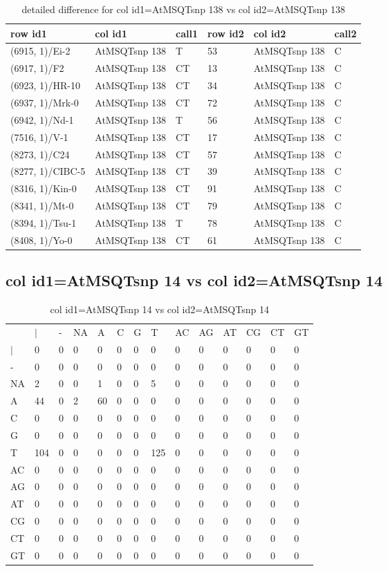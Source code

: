 \begin{center}
\begin{longtable}{|l|l|l|l|l|l|}
\caption{detailed difference for col id1=AtMSQTsnp 138 vs col id2=AtMSQTsnp 138} \label{table_dm719}\\
\hline
row id1&col id1&call1&row id2&col id2&call2\\
\hline
(6915, 1)/Ei-2&AtMSQTsnp 138&T&53&AtMSQTsnp 138&C\\
(6917, 1)/F2&AtMSQTsnp 138&CT&13&AtMSQTsnp 138&C\\
(6923, 1)/HR-10&AtMSQTsnp 138&CT&34&AtMSQTsnp 138&C\\
(6937, 1)/Mrk-0&AtMSQTsnp 138&CT&72&AtMSQTsnp 138&C\\
(6942, 1)/Nd-1&AtMSQTsnp 138&T&56&AtMSQTsnp 138&C\\
(7516, 1)/V-1&AtMSQTsnp 138&CT&17&AtMSQTsnp 138&C\\
(8273, 1)/C24&AtMSQTsnp 138&CT&57&AtMSQTsnp 138&C\\
(8277, 1)/CIBC-5&AtMSQTsnp 138&CT&39&AtMSQTsnp 138&C\\
(8316, 1)/Kin-0&AtMSQTsnp 138&CT&91&AtMSQTsnp 138&C\\
(8341, 1)/Mt-0&AtMSQTsnp 138&CT&79&AtMSQTsnp 138&C\\
(8394, 1)/Tsu-1&AtMSQTsnp 138&T&78&AtMSQTsnp 138&C\\
(8408, 1)/Yo-0&AtMSQTsnp 138&CT&61&AtMSQTsnp 138&C\\
\hline
\end{longtable}
\end{center}

\subsection{col id1=AtMSQTsnp 14 vs col id2=AtMSQTsnp 14}
\begin{center}
\begin{longtable}{|l|l|l|l|l|l|l|l|l|l|l|l|l|l|}
\caption{col id1=AtMSQTsnp 14 vs col id2=AtMSQTsnp 14} \label{table_dm720}\\
\hline
\\
\hline
&$|$&-&NA&A&C&G&T&AC&AG&AT&CG&CT&GT\\
$|$&0&0&0&0&0&0&0&0&0&0&0&0&0\\
-&0&0&0&0&0&0&0&0&0&0&0&0&0\\
NA&2&0&0&1&0&0&5&0&0&0&0&0&0\\
A&44&0&2&60&0&0&0&0&0&0&0&0&0\\
C&0&0&0&0&0&0&0&0&0&0&0&0&0\\
G&0&0&0&0&0&0&0&0&0&0&0&0&0\\
T&104&0&0&0&0&0&125&0&0&0&0&0&0\\
AC&0&0&0&0&0&0&0&0&0&0&0&0&0\\
AG&0&0&0&0&0&0&0&0&0&0&0&0&0\\
AT&0&0&0&0&0&0&0&0&0&0&0&0&0\\
CG&0&0&0&0&0&0&0&0&0&0&0&0&0\\
CT&0&0&0&0&0&0&0&0&0&0&0&0&0\\
GT&0&0&0&0&0&0&0&0&0&0&0&0&0\\
\hline
\end{longtable}
\end{center}

